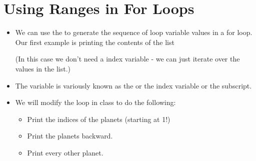 \documentclass[letterpaper,10pt,english]{sphinxmanual}
\begin{document}
\section{Using Ranges in For Loops}
\label{\detokenize{lecture_notes/lec12_loops2_for_double:using-ranges-in-for-loops}}\begin{itemize}
\item {} 
We can use the  to generate the sequence of loop variable
values in a for loop. Our first example is printing the contents of
the  list

%
\begin{sphinxVerbatim}[commandchars=\\\{\}]
  \PYG{p}{[}     
        \PYG{p}{]}
   
    \PYG{p}{[}\PYG{p}{]}
\end{sphinxVerbatim}

(In this case we don’t need a index variable - we can just iterate
over the values in the list.)

\item {} 
The variable  is variously known as the  or the 
index variable or the subscript.

\item {} 
We will modify the loop in class to do the following:
\begin{itemize}
\item {} 
Print the indices of the planets (starting at 1!)

\item {} 
Print the planets backward.

\item {} 
Print every other planet.

\end{itemize}

\end{itemize}
\end{document}
